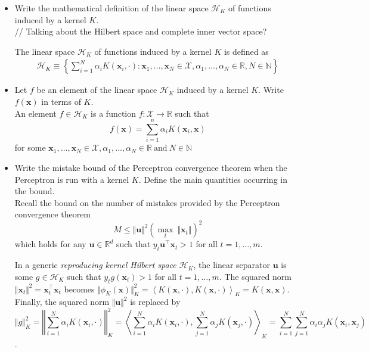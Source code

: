 \begin{itemize}
    \item Write the mathematical definition of the linear space $\mathcal{H}_K$ of functions induced by a kernel $K$.\\

    // Talking about the Hilbert space and complete inner vector space?

    The linear space $\mathcal{H}_K$ of functions induced by a kernel $K$ is defined as
    \begin{align*}
        \mathcal{H}_K \equiv \left\{ \sum_{i=1}^N \alpha_i K(\boldsymbol{x}_i, \cdot) : \boldsymbol{x}_1, \dots, \boldsymbol{x}_N \in \mathcal{X}, \alpha_1, \dots, \alpha_N \in \mathbb{R}, N \in \mathbb{N} \right\}
    \end{align*}

\item Let $f$ be an element of the linear space $\mathcal{H}_K$ induced by a kernel $K$. Write $f(\boldsymbol{x})$ in terms of $K$.\\

    An element $f \in \mathcal{H}_K$ is a function $f : \mathcal{X} \rightarrow \mathbb{R}$ such that 
    $$
    f(\boldsymbol{x}) = \sum_{i=1}^n \alpha_i K(\boldsymbol{x}_i, \boldsymbol{x})
    $$ 
    for some $\boldsymbol{x}_1, \dots, \boldsymbol{x}_N \in \mathcal{X}, \alpha_1, \dots, \alpha_N \in \mathbb{R}\ \text{and}\ N \in \mathbb{N}$
    
    \newpage
    \item Write the mistake bound of the Perceptron convergence theorem when the Perceptron is run with a kernel $K$. Define the main quantities occurring in the bound.\\

        Recall the bound on the number of mistakes provided by the Perceptron convergence theorem
        $$
        M \leq \Vert \boldsymbol{u} \Vert^2 \left(\underset{t}{\max} \ \Vert \boldsymbol{x}_t \Vert\right)^2 
        $$
        which holds for any $\boldsymbol{u} \in \mathbb{R}^d$ such that $y_t \boldsymbol{u}^\top \boldsymbol{x}_t > 1$ for all $t = 1, \dots, m$. 

        In a generic \textit{reproducing kernel Hilbert space} $\mathcal{H}_K$, the linear separator $\boldsymbol{u}$ is some $g \in \mathcal{H}_K$ such that $y_t g(\boldsymbol{x}_t) > 1$ for all $t = 1, \dots, m$. The squared norm $\Vert \boldsymbol{x}_t \Vert^2 = \boldsymbol{x}_t^\top \boldsymbol{x}_t$ becomes $\Vert \phi_K(\boldsymbol{x}) \Vert^2_K = \left\langle K(\boldsymbol{x}, \cdot), K(\boldsymbol{x}, \cdot) \right\rangle_K = K(\boldsymbol{x}, \boldsymbol{x})$.
        Finally, the squared norm $\Vert \boldsymbol{u} \Vert^2$ is replaced by $$
        \Vert g \Vert^2_K = \left\Vert \sum_{i=1}^{N} \alpha_i K(\boldsymbol{x}_i, \cdot) \right\Vert^2_K = \left\langle \sum_{i=1}^{N} \alpha_i K(\boldsymbol{x}_i, \cdot), \sum_{j=1}^{N} \alpha_j K(\boldsymbol{x}_j, \cdot) \right\rangle_K = \sum_{i=1}^N \sum_{j=1}^N \alpha_i \alpha_j K(\boldsymbol{x}_i, \boldsymbol{x}_j)
    $$.


\end{itemize}

